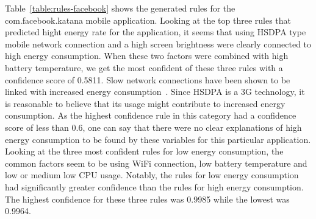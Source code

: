 Table~\ref{table:rules-facebook} shows the generated rules for the com.facebook.katana mobile application. Looking at the top three rules that predicted hight energy rate for the application, it seems that using HSDPA type mobile network connection and a high screen brightness were clearly connected to high energy consumption. When these two factors were combined with high battery temperature, we get the most confident of these three rules with a confidence score of 0.5811. Slow network connections have been shown to be linked with increased energy consumption~\cite{7146507}. Since HSDPA is a 3G technology, it is reasonable to believe that its usage might contribute to increased energy consumption. As the highest confidence rule in this category had a confidence score of less than 0.6, one can say that there were no clear explanations of high energy consumption to be found by these variables for this particular application. Looking at the three most confident rules for low energy consumption, the common factors seem to be using WiFi connection, low battery temperature and low or medium low CPU usage. Notably, the rules for low energy consumption had significantly greater confidence than the rules for high energy consumption. The highest confidence for these three rules was 0.9985 while the lowest was 0.9964. 

